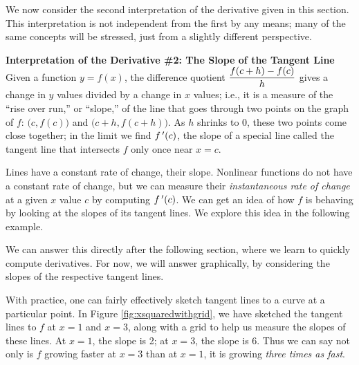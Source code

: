 We now consider the second interpretation of the derivative given in this section. This interpretation is not independent from the first by any means; many of the same concepts will be stressed, just from a slightly different perspective.

\baselineskip
\noindent\textbf{\large Interpretation of the Derivative \#2: The Slope of the Tangent Line}\\

Given a function $y=f(x)$, the difference quotient $\displaystyle \frac{f(c+h)-f(c)}{h}$ gives a change in $y$ values divided by a change in $x$ values; i.e., it is a measure of the ``rise over run,'' or ``slope,'' of the line that goes through two points on the graph of $f$: $\big(c, f(c)\big)$ and $\big(c+h,f(c+h)\big)$. As $h$ shrinks to 0, these two points come close together; in the limit we find $f\,'(c)$, the slope of a special line called the tangent line that intersects $f$ only once near $x=c$.

Lines have a constant rate of change, their slope. Nonlinear functions do not have a constant rate of change, but we can measure their \textit{instantaneous rate of change} at a given $x$ value $c$ by computing $f\,'(c)$. We can get an idea of how $f$ is behaving by looking at the slopes of its tangent lines. We explore this idea in the following example.\\

{We can answer this directly after the following section, where we learn to quickly compute derivatives. For now, we will answer graphically, by considering the slopes of the respective tangent lines. 

With practice, one can fairly effectively sketch tangent lines to a curve at a particular point. In Figure \ref{fig:xsquaredwithgrid}, we have sketched the tangent lines to $f$ at $x=1$ and $x=3$, along with a grid to help us measure the slopes of these lines. At $x=1$, the slope is 2; at $x=3$, the slope is 6. Thus we can say not only is $f$ growing faster at $x=3$ than at $x=1$, it is growing \textit{three times as fast}.
}\\



